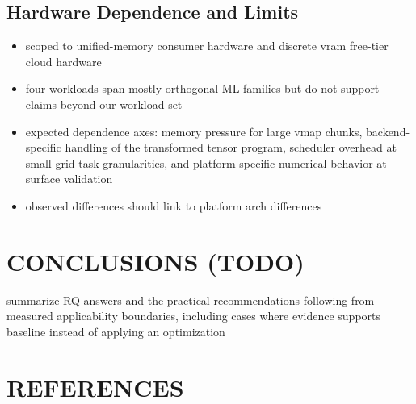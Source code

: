 \documentclass[conference]{IEEEtran}
\newcommand{\tightlist}{\setlength{\itemsep}{0pt}\setlength{\parskip}{0pt}}
\begin{document}
\subsection{Hardware Dependence and Limits}\label{hardware-dependence-and-limits}

\begin{itemize}\tightlist
  \item scoped to unified-memory consumer hardware and
    discrete vram free-tier cloud hardware
  \item four workloads span mostly orthogonal ML
    families but do not support claims beyond our workload set
  \item expected dependence axes: memory pressure for large vmap
    chunks, backend-specific handling of the transformed tensor
    program, scheduler overhead at small grid-task granularities, and
    platform-specific numerical behavior at surface validation
  \item observed differences should link to platform arch differences
\end{itemize}


\section{CONCLUSIONS (TODO)}\label{conclusions}

summarize RQ answers and the practical recommendations
following from measured applicability boundaries, including cases
where evidence supports baseline instead of applying an
optimization

\section{REFERENCES}\label{references}
\end{document}
